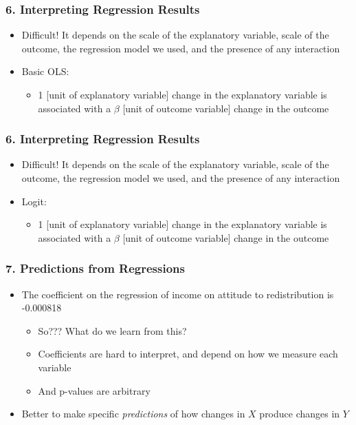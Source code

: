 \documentclass[xcolor=x11names,compress]{beamer}\usepackage[]{graphicx}\usepackage[]{color}
\renewcommand{\(}{\begin{columns}}
\renewcommand{\)}{\end{columns}}
\newcommand{\<}[1]{\begin{column}{#1}}
\renewcommand{\>}{\end{column}}
\begin{document}
\begin{frame}
\frametitle{6. Interpreting Regression Results}
\begin{itemize}
\item Difficult! It depends on the scale of the explanatory variable, scale of the outcome, the regression model we used, and the presence of any interaction
\item Basic OLS:
\begin{itemize}
\item 1 [unit of explanatory variable] change in the explanatory variable is associated with a $\beta$ [unit of outcome variable] change in the outcome
\end{itemize}
\end{itemize}
\end{frame}

\begin{frame}
\frametitle{6. Interpreting Regression Results}
\begin{itemize}
\item Difficult! It depends on the scale of the explanatory variable, scale of the outcome, the regression model we used, and the presence of any interaction
\item Logit:
\begin{itemize}
\item 1 [unit of explanatory variable] change in the explanatory variable is associated with a $\beta$ [unit of outcome variable] change in the outcome
\end{itemize}
\end{itemize}
\end{frame}

\begin{frame}
\frametitle{7. Predictions from Regressions}
\begin{itemize}
\item The coefficient on the regression of income on attitude to redistribution is -0.000818
\begin{itemize}
\pause
\item So??? What do we learn from this?
\pause
\item Coefficients are hard to interpret, and depend on how we measure each variable
\item And p-values are arbitrary
\end{itemize}  
\pause
\item Better to make specific \textit{predictions} of how changes in $X$ produce changes in $Y$
\end{itemize}
\end{frame}
\end{document}
